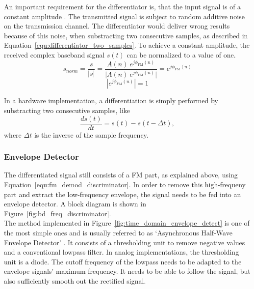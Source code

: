 An important requirement for the differentiator is, that the input signal is of a constant amplitude \cite{SchnyderHaller2002}.
The transmitted signal is subject to random additive noise on the transmission channel.
The differentiator would deliver wrong results because of this noise, when substracting two consecutive samples, as described in Equation~\eqref{equ:differentiator_two_samples}.
To achieve a constant amplitude, the received complex baseband signal $s(t)$ can be normalized to a value of one.
\begin{equation}
  s_{norm} = \frac{s}{|s|} = \frac{A(n)\ e^{j\phi_{\text{FM}}(n)}}{|{A(n)\ e^{j\phi_{\text{FM}}(n)}|}} = e^{j\phi_{\text{FM}}(n)}
\end{equation}
\begin{equation}
  |e^{j\phi_{FM}(n)}| = 1
\end{equation}

\noindent
In a hardware implementation, a differentiation is simply performed by substracting two consecutive samples, like
\begin{equation}
  \frac{d s(t)}{dt} = s(t) - s(t-\Delta t),
  \label{equ:differentiator_two_samples}
\end{equation}
where $\Delta t$ is the inverse of the sample frequency.\\ %

\subsubsection{Envelope Detector}

The differentiated signal still consists of a FM part, as explained above, using Equation~\eqref{equ:fm_demod_discriminator}.
In order to remove this high-frequeny part and extract the low-frequency envelope, the signal needs to be fed into an envelope detector.
A block diagram is shown in Figure~\ref{fig:bd_freq_discriminator}.\\

The method implemented in Figure~\ref{fig:time_domain_envelope_detect} is one of the most simple ones and is usually referred to as `Asynchronous Half-Wave Envelope Detector' \cite{DSPRelatedEnvelopeDetection}.
It consists of a thresholding unit to remove negative values and a conventional lowpass filter.
In analog implementations, the thresholding unit is a diode.
The cutoff frequency of the lowpass needs to be adapted to the envelope signals' maximum frequency.
It needs to be able to follow the signal, but also sufficiently smooth out the rectified signal.\\

